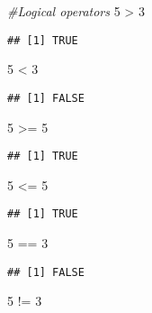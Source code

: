 \documentclass[
]{article}
\newenvironment{Shaded}{\begin{snugshade}}{\end{snugshade}}
\newcommand{\CommentTok}[1]{\textcolor[rgb]{0.56,0.35,0.01}{\textit{#1}}}
\newcommand{\DecValTok}[1]{\textcolor[rgb]{0.00,0.00,0.81}{#1}}
\newcommand{\SpecialCharTok}[1]{\textcolor[rgb]{0.00,0.00,0.00}{#1}}
\begin{document}
\begin{Shaded}
\begin{Highlighting}[]
\CommentTok{\#Logical operators}
\DecValTok{5} \SpecialCharTok{\textgreater{}} \DecValTok{3}
\end{Highlighting}
\end{Shaded}

\begin{verbatim}
## [1] TRUE
\end{verbatim}

\begin{Shaded}
\begin{Highlighting}[]
\DecValTok{5} \SpecialCharTok{\textless{}} \DecValTok{3}
\end{Highlighting}
\end{Shaded}

\begin{verbatim}
## [1] FALSE
\end{verbatim}

\begin{Shaded}
\begin{Highlighting}[]
\DecValTok{5} \SpecialCharTok{\textgreater{}=} \DecValTok{5}
\end{Highlighting}
\end{Shaded}

\begin{verbatim}
## [1] TRUE
\end{verbatim}

\begin{Shaded}
\begin{Highlighting}[]
\DecValTok{5} \SpecialCharTok{\textless{}=} \DecValTok{5}
\end{Highlighting}
\end{Shaded}

\begin{verbatim}
## [1] TRUE
\end{verbatim}

\begin{Shaded}
\begin{Highlighting}[]
\DecValTok{5} \SpecialCharTok{==} \DecValTok{3}
\end{Highlighting}
\end{Shaded}

\begin{verbatim}
## [1] FALSE
\end{verbatim}

\begin{Shaded}
\begin{Highlighting}[]
\DecValTok{5} \SpecialCharTok{!=} \DecValTok{3}
\end{Highlighting}
\end{Shaded}
\end{document}
